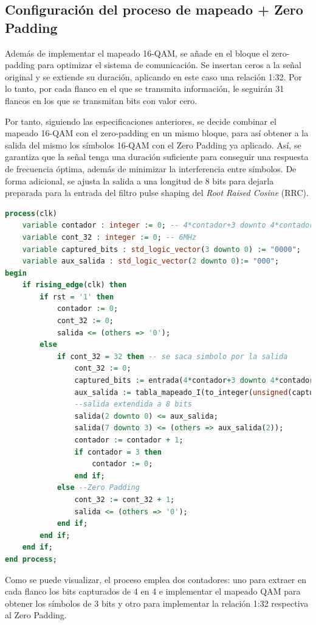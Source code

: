 \subsection{Configuración del proceso de mapeado + Zero Padding}

Además de implementar el mapeado 16-QAM, se añade en el bloque el zero-padding para optimizar el sistema de comunicación. Se insertan ceros a la señal original y se extiende su duración, aplicando en este caso una relación 1:32. Por lo tanto, por cada flanco en el que se transmita información, le seguirán 31 flancos en los que se transmitan bits con valor cero.

Por tanto, siguiendo las especificaciones anteriores, se decide combinar el mapeado 16-QAM con el zero-padding en un mismo bloque, para así obtener a la salida del mismo los símbolos 16-QAM con el Zero Padding ya aplicado. Así, se garantiza que la señal tenga una duración suficiente para conseguir una respuesta de frecuencia óptima, además de minimizar la interferencia entre símbolos. De forma adicional, se ajusta la salida a una longitud de 8 bits para dejarla preparada para la entrada del filtro pulse shaping del \textit{Root Raised Cosine} (RRC). 

\vspace{3mm}

\begin{lstlisting}[language=VHDL, style=mystyle, caption={Proceso de mapeado (Camino I) + Zero Padding}]
process(clk) 
	variable contador : integer := 0; -- 4*contador+3 downto 4*contador
	variable cont_32 : integer := 0; -- 6MHz
	variable captured_bits : std_logic_vector(3 downto 0) := "0000";
	variable aux_salida : std_logic_vector(2 downto 0):= "000";
begin
	if rising_edge(clk) then
		if rst = '1' then
			contador := 0; 
			cont_32 := 0; 
			salida <= (others => '0'); 
		else
			if cont_32 = 32 then -- se saca simbolo por la salida
				cont_32 := 0;
				captured_bits := entrada(4*contador+3 downto 4*contador);
				aux_salida := tabla_mapeado_I(to_integer(unsigned(captured_bits))); 
				--salida extendida a 8 bits
				salida(2 downto 0) <= aux_salida; 
				salida(7 downto 3) <= (others => aux_salida(2));
				contador := contador + 1; 
				if contador = 3 then 
					contador := 0; 
				end if;
			else --Zero Padding
				cont_32 := cont_32 + 1;
				salida <= (others => '0');
			end if;
		end if;
	end if;         
end process; 
\end{lstlisting}

\pagebreak

Como se puede visualizar, el proceso emplea dos contadores: uno para extraer en cada flanco los bits capturados de 4 en 4 e implementar el mapeado QAM para obtener los símbolos de 3 bits y otro para implementar la relación 1:32 respectiva al Zero Padding.

